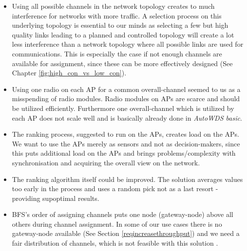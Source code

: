     \begin{itemize}
      \item Using all possible channels in the network topology creates to much interference for networks with more traffic.
	A selection process on this underlying topology is essential to our minds as selecting a few but high quality links
	leading to a planned and controlled topology will create a lot less interference than a network topology where all possible 	links are used for communications.
	This is especially the case if not enough channels are available for assignment,
	since these can be more effectively designed (See Chapter \ref{fig:high_con_vs_low_con}).
	\label{topologypreservingdealbreaker}
	
      \item Using one radio on each \ac{AP} for a common overall-channel seemed to us as a misspending of radio modules.
	Radio modules on APs are scarce and should be utilized efficiently. 
	Furthermore one overall-channel which is utilized by each \ac{AP} does not scale well and is basically already done in \textit{AutoWDS basic}.
	
      \item The ranking process, suggested to run on the APs, creates load on the APs.
	We want to use the APs merely as sensors and not as decision-makers, 
	since this puts additional load on the APs and brings problems/complexity with synchronisation and acquiring the overall view on the network.
	
      \item The ranking algorithm itself could be improved. 
	The solution averages values too early in the process and uses a random pick not as a last resort - providing supoptimal results.
	
      \item \ac{BFS}'s order of assigning channels puts one node (gateway-node) above all others during channel assignment.
	In some of our use cases there is no gateway-node available (See Section \ref{reqincreasethroughput}) and we need a fair distribution of channels, 
	which is not feasible with this solution \cite{overview_caa}.
    \end{itemize}

